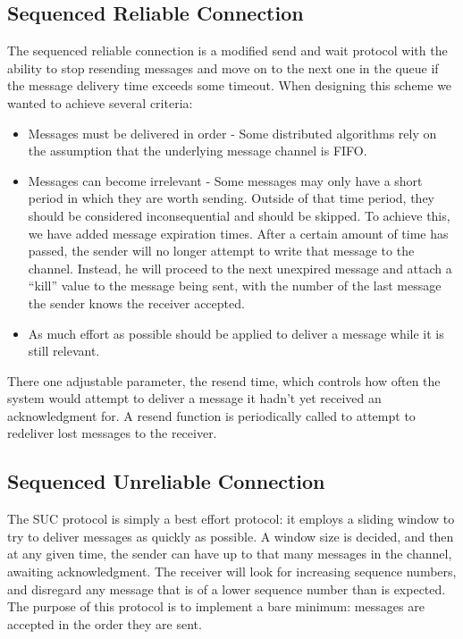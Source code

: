 \subsection{Sequenced Reliable Connection}
The sequenced reliable connection is a modified send and wait protocol with the
ability to stop resending messages and move on to the next one in the queue if
the message delivery time exceeds some timeout. When designing this scheme we
wanted to achieve several criteria:

\begin{itemize}
\item Messages must be delivered in order - Some distributed algorithms rely on
the assumption that the underlying message channel is FIFO.
\item Messages can become irrelevant - Some messages may only have a short
period in which they are worth sending. Outside of that time period, they
should be considered inconsequential and should be skipped. To achieve this, we
have added message expiration times. After a certain amount of time has passed,
the sender will no longer attempt to write that message to the channel.
Instead, he will proceed to the next unexpired message and attach a ``kill''
value to the message being sent, with the number of the last message the sender
knows the receiver accepted.
\item As much effort as possible should be applied to deliver a message while
it is still relevant.
\end{itemize}

There one adjustable parameter, the resend time, which controls how often the
system would attempt to deliver a message it hadn't yet received an
acknowledgment for. A resend function is periodically called to attempt to redeliver
lost messages to the receiver.

\subsection{Sequenced Unreliable Connection}
The SUC protocol is simply a best effort protocol: it employs a sliding window 
to try to deliver messages as quickly as possible. A window size is decided, 
and then at any given time, the sender can have up to that many messages in the 
channel, awaiting acknowledgment. The receiver will look for increasing 
sequence numbers, and disregard any message that is of a lower sequence number 
than is expected. The purpose of this protocol is to implement a bare minimum: 
messages are accepted in the order they are sent.

